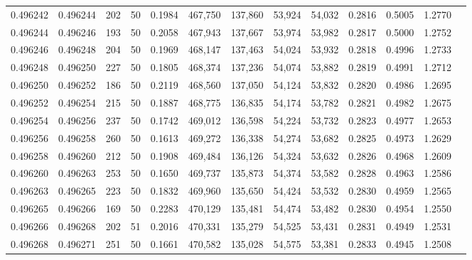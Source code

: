 \begin{tabular}{rrrrrrrrrrrrr}
0.496242 & 0.496244 &   202 &  50 &                                     0.1984 & 467,750 & 137,860 &  53,924 &  54,032 & 0.2816 & 0.5005 & 1.2770 \\
0.496244 & 0.496246 &   193 &  50 &                                     0.2058 & 467,943 & 137,667 &  53,974 &  53,982 & 0.2817 & 0.5000 & 1.2752 \\
0.496246 & 0.496248 &   204 &  50 &                                     0.1969 & 468,147 & 137,463 &  54,024 &  53,932 & 0.2818 & 0.4996 & 1.2733 \\
0.496248 & 0.496250 &   227 &  50 &                                     0.1805 & 468,374 & 137,236 &  54,074 &  53,882 & 0.2819 & 0.4991 & 1.2712 \\
0.496250 & 0.496252 &   186 &  50 &                                     0.2119 & 468,560 & 137,050 &  54,124 &  53,832 & 0.2820 & 0.4986 & 1.2695 \\
0.496252 & 0.496254 &   215 &  50 &                                     0.1887 & 468,775 & 136,835 &  54,174 &  53,782 & 0.2821 & 0.4982 & 1.2675 \\
0.496254 & 0.496256 &   237 &  50 &                                     0.1742 & 469,012 & 136,598 &  54,224 &  53,732 & 0.2823 & 0.4977 & 1.2653 \\
0.496256 & 0.496258 &   260 &  50 &                                     0.1613 & 469,272 & 136,338 &  54,274 &  53,682 & 0.2825 & 0.4973 & 1.2629 \\
0.496258 & 0.496260 &   212 &  50 &                                     0.1908 & 469,484 & 136,126 &  54,324 &  53,632 & 0.2826 & 0.4968 & 1.2609 \\
0.496260 & 0.496263 &   253 &  50 &                                     0.1650 & 469,737 & 135,873 &  54,374 &  53,582 & 0.2828 & 0.4963 & 1.2586 \\
0.496263 & 0.496265 &   223 &  50 &                                     0.1832 & 469,960 & 135,650 &  54,424 &  53,532 & 0.2830 & 0.4959 & 1.2565 \\
0.496265 & 0.496266 &   169 &  50 &                                     0.2283 & 470,129 & 135,481 &  54,474 &  53,482 & 0.2830 & 0.4954 & 1.2550 \\
0.496266 & 0.496268 &   202 &  51 &                                     0.2016 & 470,331 & 135,279 &  54,525 &  53,431 & 0.2831 & 0.4949 & 1.2531 \\
0.496268 & 0.496271 &   251 &  50 &                                     0.1661 & 470,582 & 135,028 &  54,575 &  53,381 & 0.2833 & 0.4945 & 1.2508 \\

\end{tabular}
